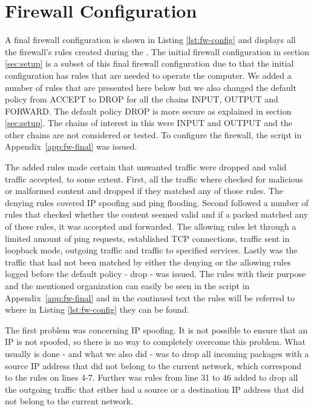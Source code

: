 \section{Firewall Configuration}
\label{sec:config}

A final firewall configuration is shown in Listing \ref{lst:fw-config} and displays all the firewall's rules created during the \lab{}. The initial firewall configuration in section \ref{sec:setup} is a subset of this final firewall configuration due to that the initial configuration has rules that are needed to operate the computer. We added a number of rules that are presented here below but we also changed the default policy from ACCEPT to DROP for all the chains INPUT, OUTPUT and FORWARD. The default policy DROP is more secure as explained in section \ref{sec:setup}. The chains of interest in this \lab{} were INPUT and OUTPUT and the other chains are not considered or tested. To configure the firewall, the script in Appendix~\ref{app:fw-final} was issued.

The added rules made certain that unwanted traffic were dropped and valid traffic accepted, to some extent. First, all the traffic where checked for malicious or malformed content and dropped if they matched any of those rules. The denying rules covered IP spoofing and ping flooding. Second followed a number of rules that checked whether the content seemed valid and if a packed matched any of these rules, it was accepted and forwarded. The allowing rules let through a limited amount of ping requests, established TCP connections, traffic sent in loopback mode, outgoing traffic and traffic to specified services. Lastly was the traffic that had not been matched by either the denying or the allowing rules logged before the default policy - drop - was issued. The rules with their purpose and the mentioned organization can easily be seen in the script in Appendix~\ref{app:fw-final} and in the continued text the rules will be referred to where in Listing \ref{lst:fw-config} they can be found.

The first problem was concerning IP spoofing. It is not possible to ensure that an IP is not spoofed, so there is no way to completely overcome this problem. What usually is done - and what we also did - was to drop all incoming packages with a source IP address that did not belong to the current network, which correspond to the rules on lines 4-7. Further was rules from line 31 to 46 added to drop all the outgoing traffic that either had a source or a destination IP address that did not belong to the current network. 

